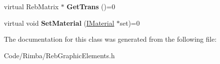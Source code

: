 \begin{DoxyCompactItemize}
\item 
virtual Reb\+Matrix $\ast$ {\bfseries Get\+Trans} ()=0\hypertarget{class_i_vertex_buffer_ae714edc6a19dbd299307b9d94bd45dcc}{}\label{class_i_vertex_buffer_ae714edc6a19dbd299307b9d94bd45dcc}

\item 
virtual void {\bfseries Set\+Material} (\hyperlink{class_i_material}{I\+Material} $\ast$set)=0\hypertarget{class_i_vertex_buffer_a5284c66108278f369ac612c239720812}{}\label{class_i_vertex_buffer_a5284c66108278f369ac612c239720812}

\end{DoxyCompactItemize}


The documentation for this class was generated from the following file\+:\begin{DoxyCompactItemize}
\item 
Code/\+Rimba/Reb\+Graphic\+Elements.\+h\end{DoxyCompactItemize}
